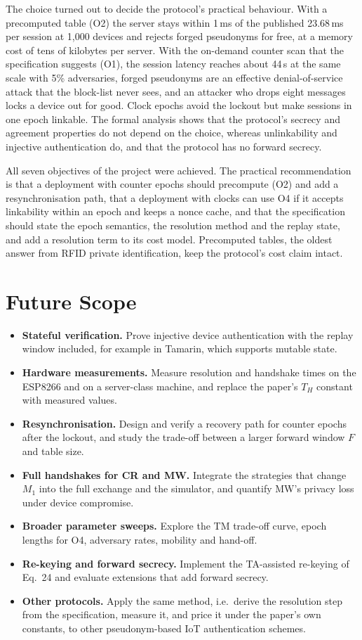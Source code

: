 The choice turned out to decide the protocol's practical behaviour. With a precomputed table (O2) the server stays within 1\,ms of the published 23.68\,ms per session at 1,000 devices and rejects forged pseudonyms for free, at a memory cost of tens of kilobytes per server. With the on-demand counter scan that the specification suggests (O1), the session latency reaches about 44\,s at the same scale with 5\% adversaries, forged pseudonyms are an effective denial-of-service attack that the block-list never sees, and an attacker who drops eight messages locks a device out for good. Clock epochs avoid the lockout but make sessions in one epoch linkable. The formal analysis shows that the protocol's secrecy and agreement properties do not depend on the choice, whereas unlinkability and injective authentication do, and that the protocol has no forward secrecy.

All seven objectives of the project were achieved. The practical recommendation is that a deployment with counter epochs should precompute (O2) and add a resynchronisation path, that a deployment with clocks can use O4 if it accepts linkability within an epoch and keeps a nonce cache, and that the specification should state the epoch semantics, the resolution method and the replay state, and add a resolution term to its cost model. Precomputed tables, the oldest answer from RFID private identification, keep the protocol's cost claim intact.

\section{Future Scope}
\begin{itemize}
\item \textbf{Stateful verification.} Prove injective device authentication with the replay window included, for example in Tamarin, which supports mutable state.
\item \textbf{Hardware measurements.} Measure resolution and handshake times on the ESP8266 and on a server-class machine, and replace the paper's $T_H$ constant with measured values.
\item \textbf{Resynchronisation.} Design and verify a recovery path for counter epochs after the lockout, and study the trade-off between a larger forward window $F$ and table size.
\item \textbf{Full handshakes for CR and MW.} Integrate the strategies that change $M_1$ into the full exchange and the simulator, and quantify MW's privacy loss under device compromise.
\item \textbf{Broader parameter sweeps.} Explore the TM trade-off curve, epoch lengths for O4, adversary rates, mobility and hand-off.
\item \textbf{Re-keying and forward secrecy.} Implement the TA-assisted re-keying of Eq.~24 and evaluate extensions that add forward secrecy.
\item \textbf{Other protocols.} Apply the same method, i.e.\ derive the resolution step from the specification, measure it, and price it under the paper's own constants, to other pseudonym-based IoT authentication schemes.
\end{itemize}

